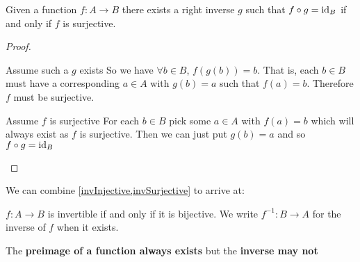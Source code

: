 \documentclass[../main.tex]{subfiles}
\begin{document}
\begin{proposition}
  Given a function $f: A \to B$ there exists a right inverse $g$ such that $f \circ g = \mathrm{id}_B$ if and only if $f$ is surjective.
  \label{invSurjective}
\end{proposition}
\begin{proof}
  \begin{proofdirection}{Assume such a $g$ exists}
    So we have $\forall b \in B$, $f(g(b)) = b$.
    That is, each $b \in B$ must have a corresponding $a \in A$ with $g(b) = a$ such that $f(a) = b$.
    Therefore $f$ must be surjective.
  \end{proofdirection}
  \begin{proofdirection}{Assume $f$ is surjective}
    For each $b \in B$ pick some $a \in A$ with $f(a) = b$ which will always exist as $f$ is surjective.
    Then we can just put $g(b) = a$ and so $f \circ g = \mathrm{id}_B$
  \end{proofdirection}
\end{proof}

We can combine \cref{invInjective,invSurjective} to arrive at:
\begin{proposition}
  $f: A \to B$ is invertible if and only if it is bijective.
  We write $f^{-1}: B \to A$ for the inverse of $f$ when it exists.
\end{proposition}
\begin{remark}[Warning]
  The \textbf{preimage of a function always exists} but the \textbf{inverse may not}
\end{remark}
\end{document}
